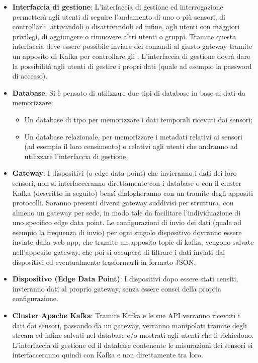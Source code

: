 		\begin{itemize}
			\item \textbf{Interfaccia di gestione}: L'interfaccia di gestione ed interrogazione permetterà agli utenti di seguire l'andamento di uno o più sensori, di controllarli, attivandoli o disattivandoli ed infine, agli utenti con maggiori privilegi, di aggiungere o rimuovere altri utenti o gruppi.
			Tramite questa interfaccia deve essere possibile inviare dei comandi al giusto gateway tramite un apposito  di Kafka per controllare gli . 
			L'interfaccia di gestione dovrà dare la possibilità agli utenti di gestire i propri dati (quale ad esempio la password di accesso).
			\item \textbf{Database}: Si è pensato di utilizzare due tipi di database in base ai dati da memorizzare:
			\begin{itemize}
				\item Un database di tipo  per memorizzare i dati temporali ricevuti dai sensori;
				\item Un database relazionale, per memorizzare i metadati relativi ai sensori (ad esempio il loro censimento) o relativi agli utenti che andranno ad utilizzare l'interfaccia di gestione.
			\end{itemize}

			\item \textbf{Gateway}: I dispositivi (o edge data point) che invieranno i dati dei loro sensori, non si interfacceranno direttamente con i database o con il cluster Kafka (descritto in seguito) bensì dialogheranno con un  tramite degli appositi protocolli.
			Saranno presenti diversi gateway suddivisi per struttura, con almeno un gateway per sede, in modo tale da facilitare l'individuazione di uno specifico edge data point.
			Le configurazioni di invio dei dati (quale ad esempio la frequenza di invio) per ogni singolo dispositivo dovranno essere inviate dalla web app, che tramite un apposito topic di kafka, vengono salvate nell'apposito gateway, che poi si occuperà di filtrare i dati inviati dai dispositivi ed eventualmente trasformarli in formato JSON. 

			\item \textbf{Dispositivo (Edge Data Point)}: I dispositivi dopo essere stati censiti, invieranno dati al proprio gateway, senza essere consci della propria configurazione.

			\item \textbf{Cluster Apache Kafka}: Tramite Kafka e le sue API verranno ricevuti i dati dai sensori, passando da un gateway, verranno manipolati tramite degli stream ed infine salvati nel database e/o mostrati agli utenti che li richiedono. L'interfaccia di gestione ed il database contenente le misurazioni dei sensori si interfacceranno quindi con Kafka e non direttamente tra loro.

		\end{itemize}
